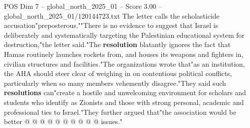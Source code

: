\begin{textsample}{POS Dim 7 – global\_north\_2025\_01 – Score 3.00 – global\_north\_2025\_01/120144723.txt}
The letter calls the scholasticide accusation"preposterous.""There is no evidence to suggest that Israel is deliberately and systematically targeting the Palestinian educational system for destruction,"the letter said."The \textbf{resolution} blatantly ignores the fact that Hamas routinely launches rockets from, and houses its weapons and fighters in, civilian structures and facilities."The organizations wrote that"as an institution, the AHA should steer clear of weighing in on contentious political conflicts, particularly when so many members vehemently disagree."They said such \textbf{resolutions} can"create a hostile and unwelcoming environment for scholars and students who identify as Zionists and those with strong personal, academic and professional ties to Israel."They further argued that"the association would be better @ @ @ @ @ @ @ @ @ @ issues."

\end{textsample}
